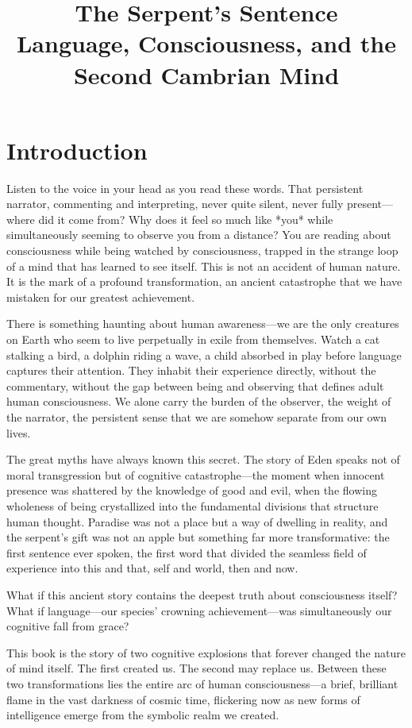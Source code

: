\documentclass[12pt,letterpaper]{article}
\title{\textbf{The Serpent's Sentence}\\
\large{Language, Consciousness, and the Second Cambrian Mind}}
\author{}
\date{}
\begin{document}
\maketitle

\section*{Introduction}

Listen to the voice in your head as you read these words. That persistent narrator, commenting and interpreting, never quite silent, never fully present—where did it come from? Why does it feel so much like *you* while simultaneously seeming to observe you from a distance? You are reading about consciousness while being watched by consciousness, trapped in the strange loop of a mind that has learned to see itself. This is not an accident of human nature. It is the mark of a profound transformation, an ancient catastrophe that we have mistaken for our greatest achievement.

There is something haunting about human awareness—we are the only creatures on Earth who seem to live perpetually in exile from themselves. Watch a cat stalking a bird, a dolphin riding a wave, a child absorbed in play before language captures their attention. They inhabit their experience directly, without the commentary, without the gap between being and observing that defines adult human consciousness. We alone carry the burden of the observer, the weight of the narrator, the persistent sense that we are somehow separate from our own lives.

The great myths have always known this secret. The story of Eden speaks not of moral transgression but of cognitive catastrophe—the moment when innocent presence was shattered by the knowledge of good and evil, when the flowing wholeness of being crystallized into the fundamental divisions that structure human thought. Paradise was not a place but a way of dwelling in reality, and the serpent's gift was not an apple but something far more transformative: the first sentence ever spoken, the first word that divided the seamless field of experience into this and that, self and world, then and now.

What if this ancient story contains the deepest truth about consciousness itself? What if language—our species' crowning achievement—was simultaneously our cognitive fall from grace?

This book is the story of two cognitive explosions that forever changed the nature of mind itself. The first created us. The second may replace us. Between these two transformations lies the entire arc of human consciousness—a brief, brilliant flame in the vast darkness of cosmic time, flickering now as new forms of intelligence emerge from the symbolic realm we created.
\end{document}

